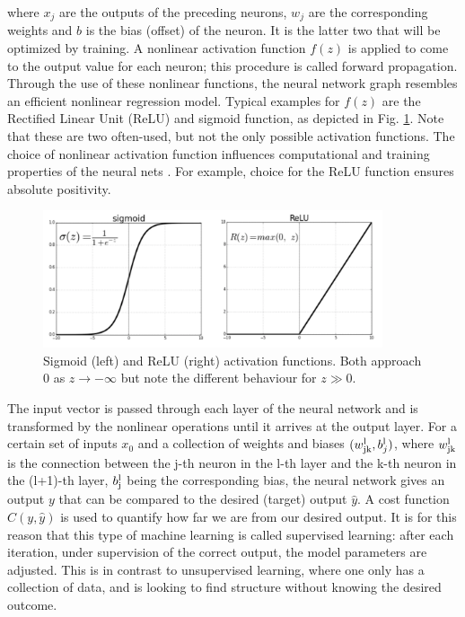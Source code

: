 where $x_j$ are the outputs of the preceding neurons, 
$w_j$ are the corresponding weights and $b$ is the bias (offset) of the neuron. 
%
It is the latter two that will be optimized by training.
A nonlinear activation function $f(z)$ is applied to come to the output value for each neuron; 
this procedure is called forward propagation. 
%
Through the use of these nonlinear functions, the neural network graph 
resembles an efficient nonlinear regression model.
% 
Typical examples for $f(z)$ are the Rectified Linear Unit (ReLU) 
and sigmoid function, as depicted in Fig. \ref{activation}. 
%
Note that these are two often-used, but not the only possible activation functions. 
%
The choice of nonlinear activation function influences computational and 
training properties of the neural nets \cite{juan}.
%
For example, choice for the ReLU function ensures absolute positivity. 

\begin{figure}[H]
    \centering
    \includegraphics[width=100mm]{plots/f(z).png}
    \caption{Sigmoid (left) and ReLU (right) activation functions. Both approach 0 as $z\rightarrow -\infty$ but note the different behaviour for $z\gg0$. }
    \label{activation}
\end{figure}

The input vector is passed through each layer of the neural network and is transformed
by the nonlinear operations until it arrives at the output layer.
%
For a certain set of inputs \textbf{$x_0$} and a collection of weights and biases $(w^{\rm l}_{\rm jk}, b^{\rm l}_j)$, 
where $w^{\rm l}_{\rm jk}$ is the connection between the j-th neuron in the l-th layer and the k-th 
neuron in the (l+1)-th layer, $b^{\rm l}_{\rm j}$ being the corresponding bias,
the neural network gives an output $y$ that can be compared to the desired (target) output $\hat{y}$. 
%
A cost function $C(y, \hat{y})$
is used to quantify how far we are from our desired output.
%
It is for this reason that this type of machine learning is called supervised learning: after
each iteration, under supervision of the correct output, the model parameters are adjusted.
%
This is in contrast to unsupervised learning, 
where one only has a collection of data, and is looking to find structure without knowing the desired outcome.

